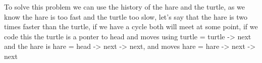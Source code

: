 To solve this problem we can use the history of the hare and the turtle, as we know the hare is too fast and the turtle too slow, let's say that the hare is two times faster than the turtle, if we have a cycle both will meet at some point, if we code this the turtle is a ponter to head and moves using turtle = turtle -> next and the hare is hare = head -> next -> next, and moves hare = hare -> next -> next